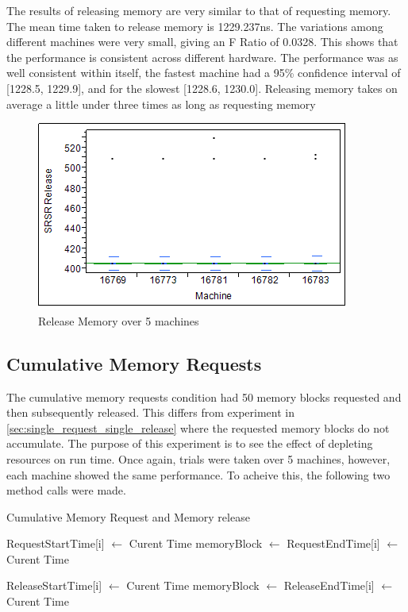 \documentclass[12pt]{report}
\begin{document}
The results of releasing memory are very similar to that of requesting memory. The mean time taken to release memory is 1229.237ns. The variations among different machines were very small, giving an F Ratio of 0.0328. This shows that the performance is consistent across different hardware. The performance was as well consistent within itself, the fastest machine had a 95\% confidence interval of [1228.5, 1229.9], and for the slowest [1228.6, 1230.0]. Releasing memory takes on average a little under three times as long as requesting memory

\begin{figure}[h!]
  \centering
    \includegraphics{SRSRReleaseMemory.png}
  \caption{Release Memory over 5 machines}
\end{figure}

\subsection{Cumulative Memory Requests}
\label{sec:cumulative_memory_requests}

\par The cumulative memory requests condition had 50 memory blocks requested and then subsequently released. This differs from experiment in \ref{sec:single_request_single_release} where the requested memory blocks do not accumulate. The purpose of this experiment is to see the effect of depleting resources on run time. Once again, trials were taken over 5 machines, however, each machine showed the same performance. To acheive this, the following two method calls were made.

\begin{algorithm}
  \caption{Cumulative Memory Request and Memory release}
  \begin{algorithmic}[1]
        \State RequestStartTime[i] $\gets$ Curent Time
        \State memoryBlock $\gets$  
        \State RequestEndTime[i] $\gets$ Curent Time
      \EndFor
    \EndFunction

        \State ReleaseStartTime[i] $\gets$ Curent Time
        \State memoryBlock $\gets$  
        \State ReleaseEndTime[i] $\gets$ Curent Time
      \EndFor
    \EndFunction
  \end{algorithmic}
\end{algorithm}
\end{document}
